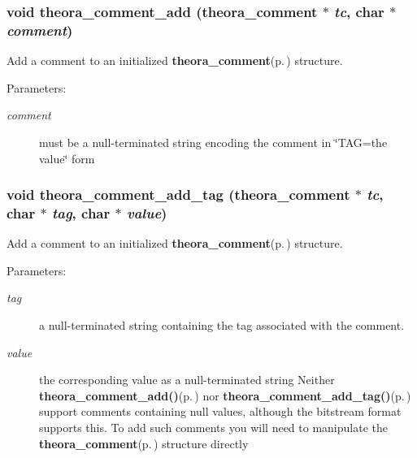 \subsubsection{\setlength{\rightskip}{0pt plus 5cm}void theora\_\-comment\_\-add ({\bf theora\_\-comment} $\ast$ {\em tc}, char $\ast$ {\em comment})}\label{theora_8h_a33}


Add a comment to an initialized {\bf theora\_\-comment}{\rm (p.\,\pageref{structtheora__comment})} structure. 

\begin{Desc}
\item[Parameters:]
\begin{description}
\item[{\em comment}]must be a null-terminated string encoding the comment in \char`\"{}TAG=the value\char`\"{} form \end{description}
\end{Desc}
\subsubsection{\setlength{\rightskip}{0pt plus 5cm}void theora\_\-comment\_\-add\_\-tag ({\bf theora\_\-comment} $\ast$ {\em tc}, char $\ast$ {\em tag}, char $\ast$ {\em value})}\label{theora_8h_a34}


Add a comment to an initialized {\bf theora\_\-comment}{\rm (p.\,\pageref{structtheora__comment})} structure. 

\begin{Desc}
\item[Parameters:]
\begin{description}
\item[{\em tag}]a null-terminated string containing the tag associated with the comment. \item[{\em value}]the corresponding value as a null-terminated string Neither {\bf theora\_\-comment\_\-add()}{\rm (p.\,\pageref{theora_8h_a33})} nor {\bf theora\_\-comment\_\-add\_\-tag()}{\rm (p.\,\pageref{theora_8h_a34})} support comments containing null values, although the bitstream format supports this. To add such comments you will need to manipulate the {\bf theora\_\-comment}{\rm (p.\,\pageref{structtheora__comment})} structure directly \end{description}
\end{Desc}
